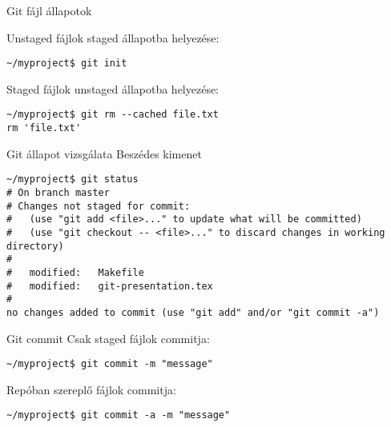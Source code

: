\documentclass[display,t]{beamer}
\begin{document}
\begin{frame}[fragile]{Git fájl állapotok}
    \begin{center}
    \end{center}
    
    Unstaged fájlok staged állapotba helyezése:
\begin{verbatim}
~/myproject$ git init
\end{verbatim}

    Staged fájlok unstaged állapotba helyezése:
\begin{verbatim}
~/myproject$ git rm --cached file.txt
rm 'file.txt'
\end{verbatim}
\end{frame}

\begin{frame}[fragile]{Git állapot vizsgálata}
    Beszédes kimenet
    \tiny
\begin{verbatim}
~/myproject$ git status
# On branch master
# Changes not staged for commit:
#   (use "git add <file>..." to update what will be committed)
#   (use "git checkout -- <file>..." to discard changes in working directory)
#
#	modified:   Makefile
#	modified:   git-presentation.tex
#
no changes added to commit (use "git add" and/or "git commit -a")
\end{verbatim}
\end{frame}

\begin{frame}[fragile]{Git commit}
    Csak staged fájlok commitja:
\begin{verbatim}
~/myproject$ git commit -m "message"
\end{verbatim}
    
    Repóban szereplő fájlok commitja:
\begin{verbatim}
~/myproject$ git commit -a -m "message"
\end{verbatim}
\end{frame}
\end{document}
